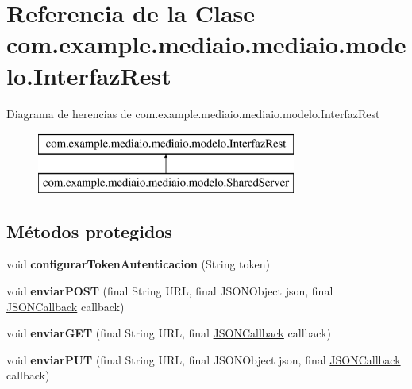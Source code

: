 \hypertarget{classcom_1_1example_1_1mediaio_1_1mediaio_1_1modelo_1_1_interfaz_rest}{}\section{Referencia de la Clase com.\+example.\+mediaio.\+mediaio.\+modelo.\+Interfaz\+Rest}
\label{classcom_1_1example_1_1mediaio_1_1mediaio_1_1modelo_1_1_interfaz_rest}
Diagrama de herencias de com.\+example.\+mediaio.\+mediaio.\+modelo.\+Interfaz\+Rest\begin{figure}[H]
\begin{center}
\leavevmode
\includegraphics[height=2.000000cm]{classcom_1_1example_1_1mediaio_1_1mediaio_1_1modelo_1_1_interfaz_rest}
\end{center}
\end{figure}
\subsection*{Métodos protegidos}
\begin{DoxyCompactItemize}
\item 
\mbox{\label{classcom_1_1example_1_1mediaio_1_1mediaio_1_1modelo_1_1_interfaz_rest_a9677c1ea246719a24252eb1fdf9b9e50}} 
void {\bfseries configurar\+Token\+Autenticacion} (String token)
\item 
\mbox{\label{classcom_1_1example_1_1mediaio_1_1mediaio_1_1modelo_1_1_interfaz_rest_aa8a213a667ad5f0cc7ef8af1aedebb6c}} 
void {\bfseries enviar\+P\+O\+ST} (final String U\+RL, final J\+S\+O\+N\+Object json, final \hyperlink{classcom_1_1example_1_1mediaio_1_1mediaio_1_1modelo_1_1_j_s_o_n_callback}{J\+S\+O\+N\+Callback} callback)
\item 
\mbox{\label{classcom_1_1example_1_1mediaio_1_1mediaio_1_1modelo_1_1_interfaz_rest_afd3b5f37bb77a9d6921038e7675869fe}} 
void {\bfseries enviar\+G\+ET} (final String U\+RL, final \hyperlink{classcom_1_1example_1_1mediaio_1_1mediaio_1_1modelo_1_1_j_s_o_n_callback}{J\+S\+O\+N\+Callback} callback)
\item 
\mbox{\label{classcom_1_1example_1_1mediaio_1_1mediaio_1_1modelo_1_1_interfaz_rest_a622cad45c91397a6ba8ff0280f2c3a14}} 
void {\bfseries enviar\+P\+UT} (final String U\+RL, final J\+S\+O\+N\+Object json, final \hyperlink{classcom_1_1example_1_1mediaio_1_1mediaio_1_1modelo_1_1_j_s_o_n_callback}{J\+S\+O\+N\+Callback} callback)
\end{DoxyCompactItemize}


